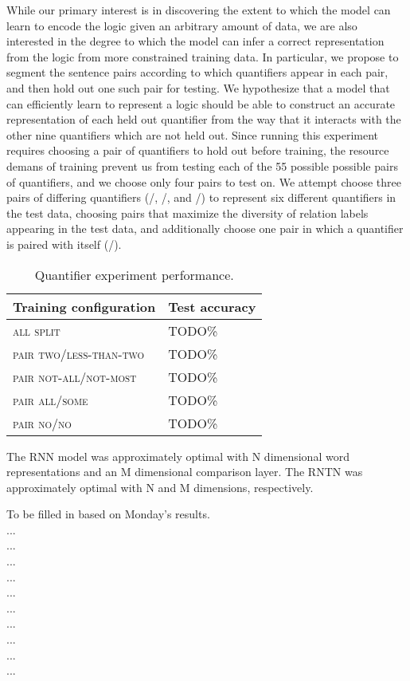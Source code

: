 While our primary interest is in discovering the extent to which the model can learn to encode the logic given an arbitrary amount of data, we are also interested in the degree to which the model can infer a correct representation from the logic from more constrained training data. In particular, we propose to segment the sentence pairs according to which quantifiers appear in each pair, and then hold out one such pair for testing. We hypothesize that a model that can efficiently learn to represent a logic should be able to construct an accurate representation of each held out quantifier from the way that it interacts with the other nine quantifiers which are not held out. Since running this experiment requires choosing a pair of quantifiers to hold out before training, the resource demans of training prevent us from testing each of the 55 possible possible pairs of quantifiers, and we choose only four pairs to test on. We attempt choose three pairs of differing quantifiers (/, /, and /) to represent six different quantifiers in the test data, choosing pairs that maximize the diversity of relation labels appearing in the test data, and additionally choose one pair in which a quantifier is paired with itself (/).

\begin{table}\small\centering
\begin{tabular}{|l|l|}\hline
\textbf{Training configuration} & \textbf{Test accuracy}\\\hline
\textsc{all split}	&	TODO\% \\\hline
\textsc{pair two/less-than-two}	&	TODO\% \\
\textsc{pair not-all/not-most}	&	TODO\% \\
\textsc{pair all/some}	&	TODO\% \\
\textsc{pair no/no}	&	TODO\% \\
\hline
\end{tabular}

\caption{Quantifier experiment performance.\label{resultstable}}
\end{table} %


The RNN model was approximately optimal with N dimensional word representations and an M dimensional comparison layer. The RNTN was approximately optimal with N and M dimensions, respectively.

To be filled in based on Monday's results.\\...\\...\\...\\...\\...\\...\\...\\...\\...\\...

